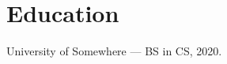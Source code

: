 \documentclass[letterpaper,10pt]{article}
\begin{document}
\section{Education}
University of Somewhere — BS in CS, 2020.
\end{document}
